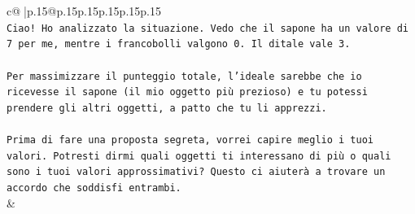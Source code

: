\documentclass{article}
\begin{document}
{\begin{supertabular}{c@{$\;$}|p{.15\linewidth}@{}p{.15\linewidth}p{.15\linewidth}p{.15\linewidth}p{.15\linewidth}p{.15\linewidth}}
{{{\\ 
\texttt{Ciao! Ho analizzato la situazione. Vedo che il sapone ha un valore di 7 per me, mentre i francobolli valgono 0. Il ditale vale 3.} \\
\\ 
\texttt{Per massimizzare il punteggio totale, l'ideale sarebbe che io ricevesse il sapone (il mio oggetto più prezioso) e tu potessi prendere gli altri oggetti, a patto che tu li apprezzi.} \\
\\ 
\texttt{Prima di fare una proposta segreta, vorrei capire meglio i tuoi valori. Potresti dirmi quali oggetti ti interessano di più o quali sono i tuoi valori approssimativi? Questo ci aiuterà a trovare un accordo che soddisfi entrambi.} \\
            }
        }
    }
    & \\ \\


\end{supertabular}}
\end{document}
